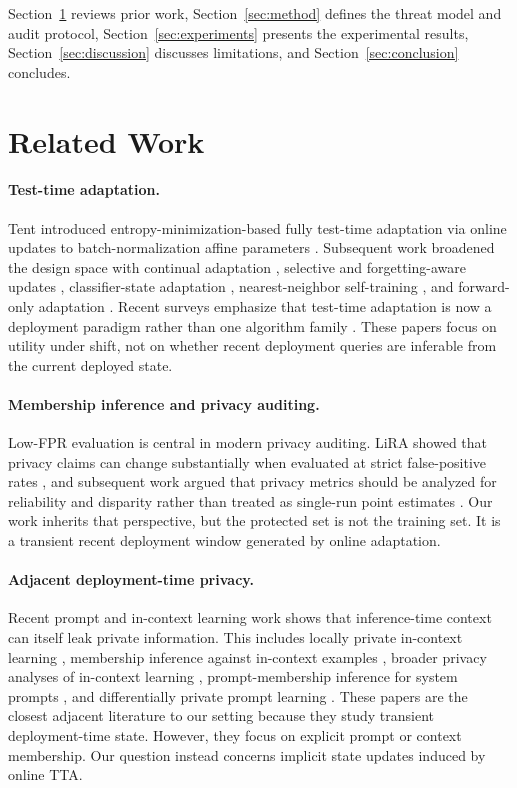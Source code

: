 Section~\ref{sec:related} reviews prior work, Section~\ref{sec:method} defines the threat model and audit protocol, Section~\ref{sec:experiments} presents the experimental results, Section~\ref{sec:discussion} discusses limitations, and Section~\ref{sec:conclusion} concludes.

\section{Related Work}
\label{sec:related}

\paragraph{Test-time adaptation.}
Tent introduced entropy-minimization-based fully test-time adaptation via online updates to batch-normalization affine parameters \citep{wang2021tent}. Subsequent work broadened the design space with continual adaptation \citep{wang2022cotta}, selective and forgetting-aware updates \citep{niu2022eata}, classifier-state adaptation \citep{iwasawa2021t3a}, nearest-neighbor self-training \citep{jang2023tast}, and forward-only adaptation \citep{niu2024foa}. Recent surveys emphasize that test-time adaptation is now a deployment paradigm rather than one algorithm family \citep{xiao2024beyond}. These papers focus on utility under shift, not on whether recent deployment queries are inferable from the current deployed state.

\paragraph{Membership inference and privacy auditing.}
Low-FPR evaluation is central in modern privacy auditing. LiRA showed that privacy claims can change substantially when evaluated at strict false-positive rates \citep{carlini2022lira}, and subsequent work argued that privacy metrics should be analyzed for reliability and disparity rather than treated as single-run point estimates \citep{wang2025reliability}. Our work inherits that perspective, but the protected set is not the training set. It is a transient recent deployment window generated by online adaptation.

\paragraph{Adjacent deployment-time privacy.}
Recent prompt and in-context learning work shows that inference-time context can itself leak private information. This includes locally private in-context learning \citep{zheng2024ldpicl}, membership inference against in-context examples \citep{wen2024iclmia}, broader privacy analyses of in-context learning \citep{duan2024privacyicl}, prompt-membership inference for system prompts \citep{levin2025promptmia}, and differentially private prompt learning \citep{duan2023flocks}. These papers are the closest adjacent literature to our setting because they study transient deployment-time state. However, they focus on explicit prompt or context membership. Our question instead concerns implicit state updates induced by online TTA.

